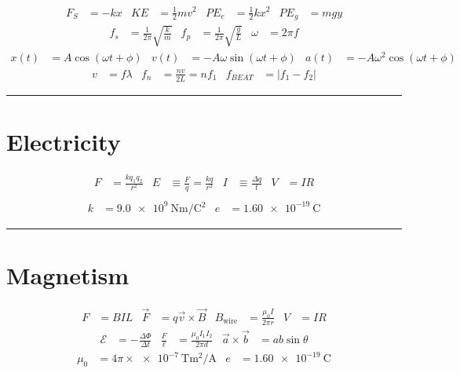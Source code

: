 \documentclass[10pt]{exam}
\begin{document}
\begin{align*}
  F_S &= -kx &
  KE &= \frac{1}{2}mv^2 &
  PE_e &= \frac{1}{2}kx^2&
  PE_g &= mgy
\end{align*}
%
\begin{align*}
  f_s &=\frac{1}{2\pi}\sqrt{\frac{k}{m}} &
  f_p &=\frac{1}{2\pi}\sqrt{\frac{g}{L}} &
  \omega &= 2\pi f
\end{align*}
%
\begin{align*}
    x(t) &= A \cos\left(\omega t + \phi\right) &
    v(t) &= -A\omega\sin\left(\omega t + \phi\right) &
    a(t) &= -A\omega^2\cos\left(\omega t + \phi\right)
\end{align*}
%
\begin{align*}
  v &= f \lambda &
  f_n &= \frac{nv}{2L} = nf_1 &
  f_{BEAT} &= \left|f_1-f_2\right| %
\end{align*}

\hrule

\section*{Electricity}

\begin{align*}
  F &= \frac{kq_1 q_2} {r^2} &
  E &\equiv \frac{F}{q} = \frac{kq}{r^2} &
  I &\equiv \frac{\Delta q}{t} &
  V &= IR \\
\end{align*}
%
\begin{align*}
  k &= \SI{9.0e9}{\newton\meter\per\coulomb^2} &
  e &= \SI{1.60e-19}{\coulomb}
\end{align*}

\hrule

\section*{Magnetism}

\begin{align*}
  F &= BIL &
  \vec{F} &= q \vec{v} \times \vec{B} &
  B_{\text{wire}} &= \frac{\mu_0 I}{2\pi r} &
  V &= IR
\end{align*}
%
\begin{align*}
  \mathcal{E} &= - \frac{\Delta \Phi}{\Delta t} &
  \frac{F}{\ell} &= \frac{\mu_0 I_1 I_2}{2\pi d} &
  \vec{a} \times \vec{b} &= ab\sin\theta
\end{align*}
%
\begin{align*}
  \mu_0 &= 4\pi\times\SI{e-7}{\tesla\meter^2\per\ampere} &
  e &= \SI{1.60e-19}{\coulomb}
\end{align*}
\end{document}
